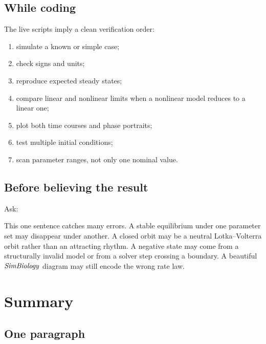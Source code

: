 \documentclass[a4paper]{article}
\newcommand{\SimBio}{\ensuremath{\pksym{SimBiology}}}
\begin{document}
\subsection{While coding}

The live scripts imply a clean verification order:
\begin{enumerate}[leftmargin=2em]
  \item simulate a known or simple case;
  \item check signs and units;
  \item reproduce expected steady states;
  \item compare linear and nonlinear limits when a nonlinear model reduces to a linear one;
  \item plot both time courses and phase portraits;
  \item test multiple initial conditions;
  \item scan parameter ranges, not only one nominal value.
\end{enumerate}

\subsection{Before believing the result}

Ask:
\begin{center}
\end{center}
This one sentence catches many errors. A stable equilibrium under one parameter set may disappear under another. A closed orbit may be a neutral Lotka--Volterra orbit rather than an attracting rhythm. A negative state may come from a structurally invalid model or from a solver step crossing a boundary. A beautiful \SimBio{} diagram may still encode the wrong rate law.

\section{Summary}

\subsection{One paragraph}
\end{document}
